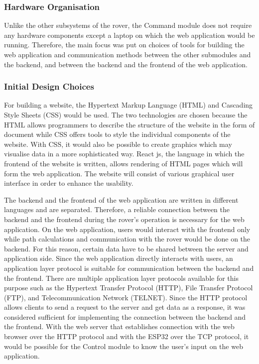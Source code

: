 \documentclass[a4paper]{article}
\begin{document}
\subsubsection{Hardware Organisation}

Unlike the other subsystems of the rover, the Command module does not require any 
hardware components except a laptop on which the web application would be running. 
Therefore, the main focus was put on choices of tools for building the web application 
and communication methods between the other submodules and the backend, and between the 
backend and the frontend of the web application. 

\subsubsection{Initial Design Choices}

For building a website, the Hypertext Markup Language (HTML) and Cascading Style Sheets (CSS) would 
be used. The two technologies are chosen because the HTML allows programmers to describe the structure 
of the website in the form of document while CSS offers tools to style the individual components of 
the website. With CSS, it would also be possible to create graphics which may visualise data in a more 
sophisticated way. React js, the language in which the frontend of the website is written, allows rendering 
of HTML pages which will form the web application. The website will consist of various graphical user 
interface in order to enhance the usability. 

The backend and the frontend of the web application are written in different languages 
and are separated. Therefore, a reliable connection between the backend and the frontend during the rover's 
operation is necessary for the web application. On the web application, users would 
interact with the frontend only while path calculations and communication with 
the rover would be done on the backend. For this reason, certain data have to be 
shared between the server and application side. Since the web application directly interacts 
with users, an application layer protocol is suitable for communication between the 
backend and the frontend. There are multiple application layer protocols available 
for this purpose such as the Hypertext Transfer Protocol (HTTP), File Transfer Protocol (FTP), 
and Telecommunication Network (TELNET). Since the HTTP protocol allows clients to send 
a request to the server and get data as a response, it was considered sufficient for 
implementing the connection between the backend and the frontend. With the web server that 
establishes connection with the web browser over the HTTP protocol and with the ESP32 over 
the TCP protocol, it would be possible for the Control module to know the user's input on 
the web application. 
\end{document}

